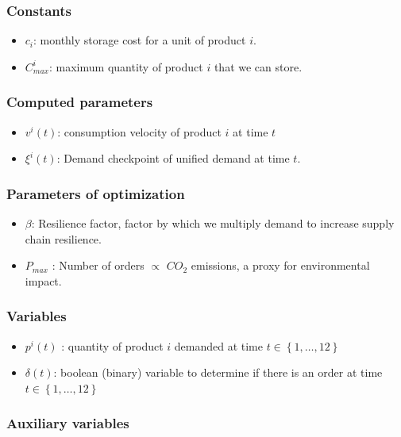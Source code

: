 \documentclass[11pt,twocolumn]{article}
\begin{document}
\subsubsection{Constants}
\begin{itemize}
	\item $c_i$: monthly storage cost for a unit of product  $i$.
	\item $C_{max}^{i}$: maximum quantity of product $i$ that we can store.
\end{itemize}

\subsubsection{Computed parameters}
\begin{itemize}
\item  $v^{i}\left( t \right) $: consumption velocity of product $i$ at time  $t$
\item $\xi^{i}\left( t \right) $: Demand checkpoint of unified demand at time $t$.
\end{itemize}


\subsubsection{Parameters of optimization}
\begin{itemize}
	\item $\beta$: Resilience factor, factor by which we multiply demand to increase supply chain resilience.
	\item  $P_{max}$ : Number of orders $\propto$ $CO_2$ emissions, a proxy for environmental impact.
\end{itemize}

\subsubsection{Variables}
\begin{itemize}
	\item $p^{i}\left( t \right) $ : quantity of product $i$ demanded at time  $t \in \left\{ 1,\ldots,12 \right\} $
	\item  $\delta\left( t \right) $: boolean (binary) variable to determine if there is an order at time \qquad \qquad $t \in \left\{ 1,\ldots,12 \right\} $
\end{itemize}

\subsubsection{Auxiliary variables}
\end{document}
